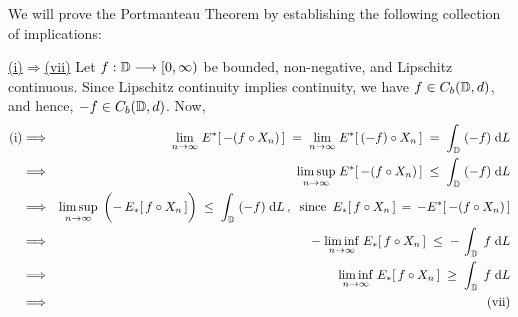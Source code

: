 \proof
We will prove the Portmanteau Theorem by establishing the following collection
of implications:
\begin{center}
\end{center}

\vskip 0.0cm \noindent
\underline{(i)\;$\Longrightarrow$\;(vii)}
\vskip 0.2cm \noindent
Let $f : \mathbb{D} \longrightarrow [0,\infty)$ be bounded, non-negative, and Lipschitz continuous.
Since Lipschitz continuity implies continuity, we have $f \in C_{b}(\mathbb{D},d)$, and hence, $-f \in C_{b}(\mathbb{D},d)$.
Now,
\begin{eqnarray*}
\textnormal{(i)}
&\Longrightarrow&
	{\color{white}1}\underset{n\rightarrow\infty}{\lim}\;E^{*}\!\left[\,-(f \circ X_{n})\,\right]
	\;=\; \underset{n\rightarrow\infty}{\lim}\;E^{*}\!\left[\,(-f) \circ X_{n}\,\right]
	\;=\; \int_{\D}\;(-f)\;\d L
\\
&\Longrightarrow&
	\underset{n\rightarrow\infty}{\limsup}\;E^{*}\!\left[\,-(f \circ X_{n})\,\right] \;\leq\; \int_{\D}\;(-f)\;\d L
\\
&\Longrightarrow&
	\underset{n\rightarrow\infty}{\limsup}\;
	\left(\overset{{\color{white}\vert}}{-}\,E_{*}\!\left[\,f \circ X_{n}\,\right]\right) \;\leq\; \int_{\D}\;(-f)\;\d L\,,
	\;\;\textnormal{since \,$E_{*}[\,f \circ X_{n}\,] \,=\, -E^{*}[\,-(f \circ X_{n})\,]$}
\\
&\Longrightarrow&
	-\;\underset{n\rightarrow\infty}{\liminf}\;E_{*}\!\left[\,f \circ X_{n}\,\right]
	\;\leq\; -\,\int_{\D}\;f\;\d L
\\
&\Longrightarrow&
	\underset{n\rightarrow\infty}{\liminf}\;E_{*}\!\left[\,f \circ X_{n}\,\right]
	\;\geq\; \int_{\D}\;f\;\d L
\\
&\Longrightarrow&
	\textnormal{(vii)}
\end{eqnarray*}

